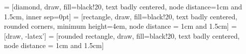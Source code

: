 \usepackage{tikz}
\usetikzlibrary{shapes,arrows}

 = [diamond, draw, fill=black!20, text badly centered, node distance=1cm and 1.5cm, inner sep=0pt]
 = [rectangle, draw, fill=black!20, text badly centered, rounded corners, minimum height=4em, node distance = 1cm and 1.5cm]
 = [draw, -latex']
 = [rounded rectangle, draw, fill=black!20, text badly centered, node distance = 1cm and 1.5cm]
